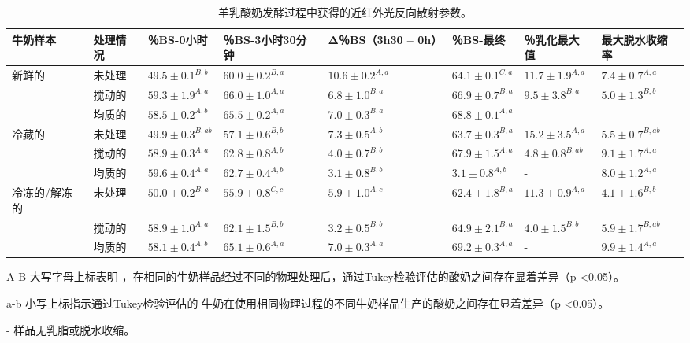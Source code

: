\documentclass[twocolumn]{ctexart}
\begin{document}
\begin{table*}
\centering
\caption{羊乳酸奶发酵过程中获得的近红外光反向散射参数。}
\begin{threeparttable}
\begin{tabular}{llllllll}		
	\hline
	牛奶样本 & 处理情况 & ％BS-0小时 & ％BS-3小时30分钟 & Δ％BS（3h30 – 0h） & ％BS-最终 & ％乳化最大值 & 最大脱水收缩率\\
	\hline
	新鲜的 & 未处理 & $49.5 \pm 0.1^{B,b}$ & $60.0 \pm 0.2^{B,a}$ & $10.6 \pm 0.2^{A,a}$ & $64.1 \pm 0.1^{C,a}$ & $11.7 \pm 1.9^{A,a}$ & $7.4 \pm 0.7^{A,a}$ \\
		   & 搅动的 & $59.3 \pm 1.9^{A,a}$ & $66.0 \pm 1.0^{A,a}$ & $6.8 \pm 1.0^{B,a}$ & $66.9 \pm 0.7^{B,a}$ & $9.5 \pm 3.8^{B,a}$ & $5.0 \pm 1.3^{B,b}$\\
		   & 均质的 & $58.5 \pm 0.2^{A,b}$ & $65.5 \pm 0.2^{A,a}$ & $7.0 \pm 0.3^{B,a}$ & $68.8 \pm 0.1^{A,a}$ & - & -\\
	冷藏的 & 未处理 & $49.9 \pm 0.3^{B,ab}$ & $57.1 \pm 0.6^{B,b}$ & $7.3 \pm 0.5^{A,b}$ & $63.7 \pm 0.3^{B,a}$ & $15.2 \pm 3.5^{A,a}$ & $5.5 \pm 0.7^{B,ab}$\\
		   & 搅动的 & $58.9 \pm 0.3^{A,a}$ & $62.8 \pm 0.8^{A,b}$ & $4.0 \pm 0.7^{B,b}$ & $67.9 \pm 1.5^{A,a}$ & $4.8 \pm 0.8^{B,ab}$ & $9.1 \pm 1.7^{A,a}$\\
           & 均质的 & $59.6 \pm 0.4^{A,a}$ & $62.7 \pm 0.4^{A,b}$ & $3.1 \pm 0.8^{B,b}$ & $3.1 \pm 0.8^{A,b}$ & - & $8.0 \pm 1.2^{A,a}$\\
	冷冻的/解冻的 & 未处理 & $50.0 \pm 0.2^{B,a}$ & $55.9 \pm 0.8^{C,c}$ & $5.9 \pm 1.0^{A,c}$ & $62.4 \pm 1.8^{B,a}$ & $11.3 \pm 0.9^{A,a}$ & $4.1 \pm 1.6^{B,b}$\\
		   & 搅动的 & $58.9 \pm 1.0^{A,a}$ & $62.1 \pm 1.5^{B,b}$ & $3.2 \pm 0.5^{B,b}$ & $64.9 \pm 2.1^{B,a}$ & $4.0 \pm 1.5^{B,b}$ & $5.9 \pm 1.7^{B,ab}$\\
		   & 均质的 & $58.1 \pm 0.4^{A,b}$ & $65.1 \pm 0.6^{A,a}$ & $7.0 \pm 0.3^{A,a}$ & $69.2 \pm 0.3^{A,a}$ & - & $9.9 \pm 1.4^{A,a}$\\
	\hline
\end{tabular}	
\begin{tablenotes}
	\footnotesize
	\item[A-B] 大写字母上标表明 ，在相同的牛奶样品经过不同的物理处理后，通过Tukey检验评估的酸奶之间存在显着差异（p <0.05）。
	\item[a-b] 小写上标指示通过Tukey检验评估的 牛奶在使用相同物理过程的不同牛奶样品生产的酸奶之间存在显着差异（p <0.05）。
	\item[-] 样品无乳脂或脱水收缩。
\end{tablenotes}
\end{threeparttable}
\end{table*}
\end{document}
